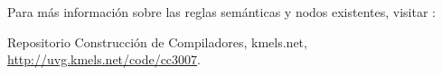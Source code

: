 \documentclass[12pt,letterpaper]{article}
\begin{document}
Para m\'{a}s informaci\'{o}n sobre las reglas sem\'{a}nticas y nodos existentes, visitar \cite{kmels-rep-cc3007}:

\begin{thebibliography}{1}
 Repositorio Construcci\'{o}n de Compiladores, kmels.net, \url{http://uvg.kmels.net/code/cc3007}.
\end{thebibliography}
\end{document}
